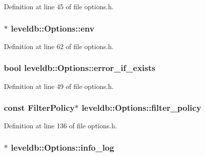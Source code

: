 Definition at line 45 of file options.\+h.

\hypertarget{structleveldb_1_1_options_aeb08bfe820e9c89f57446d6fbd2e6ea8}{}
\subsubsection[{env}]{$\ast$ leveldb\+::\+Options\+::env}\label{structleveldb_1_1_options_aeb08bfe820e9c89f57446d6fbd2e6ea8}


Definition at line 62 of file options.\+h.

\hypertarget{structleveldb_1_1_options_aff3b99b1b30a2dba9642adc6c912d5b7}{}
\subsubsection[{error\+\_\+if\+\_\+exists}]{\setlength{\rightskip}{0pt plus 5cm}bool leveldb\+::\+Options\+::error\+\_\+if\+\_\+exists}\label{structleveldb_1_1_options_aff3b99b1b30a2dba9642adc6c912d5b7}


Definition at line 49 of file options.\+h.

\hypertarget{structleveldb_1_1_options_a24c88997a866d535e68de15b5c3cd02b}{}
\subsubsection[{filter\+\_\+policy}]{\setlength{\rightskip}{0pt plus 5cm}const {\bf Filter\+Policy}$\ast$ leveldb\+::\+Options\+::filter\+\_\+policy}\label{structleveldb_1_1_options_a24c88997a866d535e68de15b5c3cd02b}


Definition at line 136 of file options.\+h.

\hypertarget{structleveldb_1_1_options_af5545cba00b0e9763ad0279a74acc429}{}
\subsubsection[{info\+\_\+log}]{$\ast$ leveldb\+::\+Options\+::info\+\_\+log}\label{structleveldb_1_1_options_af5545cba00b0e9763ad0279a74acc429}


